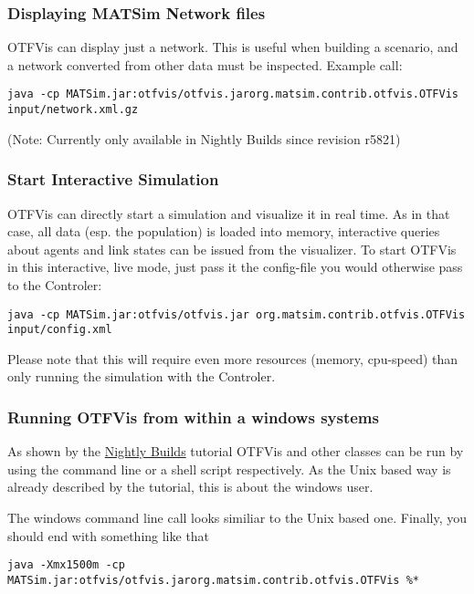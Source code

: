 \documentclass[a4paper,11pt]{report}
\begin{document}
\subsubsection{Displaying MATSim Network files}

OTFVis can display just a network. This is useful when building a  scenario, and a network converted from other data must be inspected.  Example call:
\begin{verbatim}
java -cp MATSim.jar:otfvis/otfvis.jarorg.matsim.contrib.otfvis.OTFVis input/network.xml.gz
\end{verbatim}

(Note: Currently only available in Nightly Builds since revision r5821)

\subsubsection{Start Interactive Simulation}

OTFVis can directly start a simulation and visualize it in real time.  As in that case, all data (esp. the population) is loaded into memory,  interactive queries about agents and link states can be issued from the  visualizer. To start OTFVis in this interactive, live mode, just pass it  the config-file you would otherwise pass to the Controler:
\begin{verbatim}
java -cp MATSim.jar:otfvis/otfvis.jar org.matsim.contrib.otfvis.OTFVis input/config.xml
\end{verbatim}

Please note that this will require even more resources (memory, cpu-speed) than only running the simulation with the Controler.

\subsubsection{Running OTFVis from within a windows systems}

As shown by the \href{http://www.matsim.org/downloads/nightly}{Nightly Builds}  tutorial OTFVis and other classes can be run by using the command line  or a shell script respectively. As the Unix based way is already  described by the tutorial, this is about the windows user.

The windows command line call looks similiar to the Unix based one. Finally, you should end with something like that
\begin{verbatim}
java -Xmx1500m -cp MATSim.jar:otfvis/otfvis.jarorg.matsim.contrib.otfvis.OTFVis %*
\end{verbatim}
\end{document}
